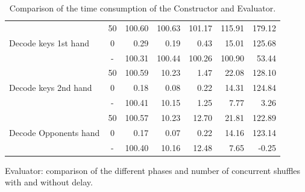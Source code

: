 \begin{table}[!htb]
\begin{subtable}{\textwidth}
{\begin{tabular}{l || c |r r r r r}
    \multirow{3}{*}{Decode keys 1st hand} & 50 & 100.60 & 100.63 & 101.17 & 115.91 & 179.12 \\
                                          &  0 &   0.29 &   0.19 &   0.43 &  15.01 & 125.68 \\
                                          \cline{2-7}
                                          &  - & 100.31 & 100.44 & 100.26 & 100.90 &  53.44 \\
    \hline
    \multirow{3}{*}{Decode keys 2nd hand} & 50 & 100.59 & 10.23 & 1.47 & 22.08 & 128.10 \\
                                          &  0 &   0.18 &  0.08 & 0.22 & 14.31 & 124.84 \\ 
                                          \cline{2-7}
                                          &  - & 100.41 & 10.15 & 1.25 &  7.77 &   3.26 \\
    \hline
    \multirow{3}{*}{Decode Opponents hand} & 50 & 100.57 & 10.23 & 12.70 & 21.81 & 122.89 \\
                                           &  0 &   0.17 &  0.07 &  0.22 & 14.16 & 123.14 \\
                                           \cline{2-7}
                                           &  - & 100.40 & 10.16 & 12.48 &  7.65 & -0.25
    \end{tabular}
    }
    \caption{Evaluator: comparison of the different phases and number of concurrent shuffles with and without delay.}
    \end{subtable}%

\caption{Comparison of the time consumption of the Constructor and Evaluator.}
\end{table}


